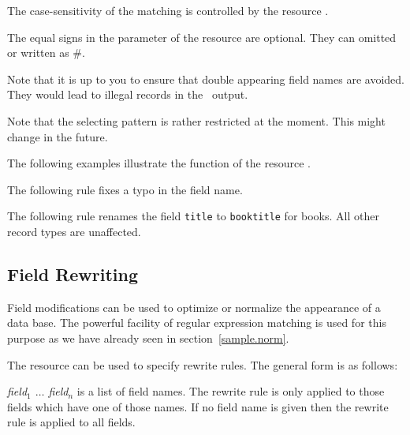 \documentclass[11pt,a4paper]{scrbook}
\begin{document}
The case-sensitivity of the matching is controlled by the resource
. 

The equal signs in the parameter of the resource are optional. They can
omitted or written as \#.

Note that it is up to you to ensure that double appearing field names are
avoided. They would lead to illegal records in the \BibTeX\ output.

Note that the selecting pattern is rather restricted at the moment. This might
change in the future.

The following examples illustrate the function of the resource
.

The following rule fixes a typo in the field name.

\begin{Resources}
\end{Resources}

The following rule renames the field \texttt{title} to \texttt{booktitle} for
books. All other record types are unaffected.

\begin{Resources}
\end{Resources}


\subsection{Field Rewriting}\label{sec:field.rewriting}

Field modifications can be used to optimize or normalize the appearance of a
\BibTeX{} data base. The powerful facility of regular expression matching is
used for this purpose as we have already seen in section~\ref{sample.norm}.

The resource  can be used to specify rewrite rules. The
general form is as follows:

\begin{Resources}
\end{Resources}

\emph{field\(_1\) \(\ldots\) field\(_n\)} is a list of field names. The
rewrite rule is only applied to those fields which have one of those names. If
no field name is given then the rewrite rule is applied to all fields.
\end{document}
